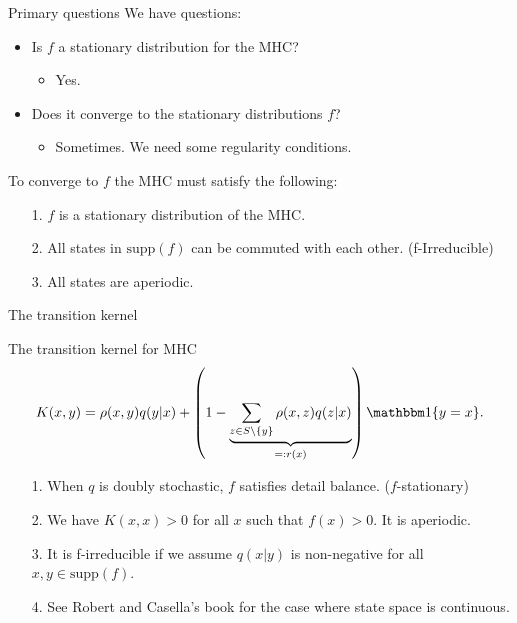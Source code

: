\documentclass[11pt]{beamer}
\begin{document}
    \begin{frame}{Primary questions}
        We have questions: 
        \begin{itemize}
            \item Is $f$ a stationary distribution for the MHC? 
                \begin{itemize}
                    \item Yes. 
                \end{itemize}
            \item Does it converge to the stationary distributions $f$? 
            \begin{itemize}
                \item Sometimes. We need some regularity conditions. 
            \end{itemize}
        \end{itemize}
        \vspace{2em}
        To converge to $f$ the MHC must satisfy the following: 
        \begin{itemize}
            \item [1.] $f$ is a stationary distribution of the MHC. 
            \item [2.] All states in $\text{supp}(f)$ can be commuted with each other. (f-Irreducible)
            \item [3.] All states are aperiodic. 
        \end{itemize}
    \end{frame}
    \begin{frame}{The transition kernel}
        \begin{block}{The transition kernel for MHC}
            \begin{align*}
                K(x, y) = 
                \rho(x, y)q(y|x) + 
                \left(
                    1 - \underbrace{\sum_{z \in S\setminus \{y\} }^{}\rho(x, z)q(z|x)}_{=:r(x)}
                \right) \mathbbm 1\{y = x\}. 
            \end{align*}
        \end{block}
        \begin{itemize}
            \item [1.] When $q$ is doubly stochastic, $f$ satisfies detail balance. ($f$-stationary)
            \item [2.] We have $K(x,x)> 0$ for all $x$ such that $f(x) > 0$. It is aperiodic. 
            \item [3.] It is f-irreducible if we assume $q(x|y)$ is non-negative for all $x, y\in \text{supp}(f)$. 
            \item [4.] See Robert and Casella's book \cite{book:robert_casella_2005} for the case where state space is continuous. 
        \end{itemize}
    \end{frame}
\end{document}
